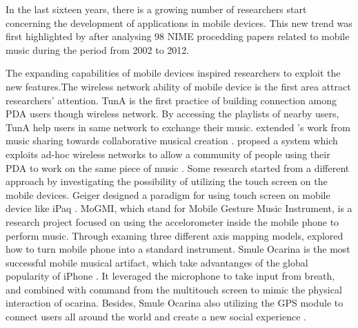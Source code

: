 In the last sixteen years, there is a growing number of researchers start concerning the development of applications in mobile devices. This new trend was first highlighted by \citeauthor{Reference12} after analysing 98 NIME procedding papers related to mobile music during the period from 2002 to 2012\citep{Reference12}.

The expanding capabilities of mobile devices inspired researchers to exploit the new features.The wireless network ability of mobile device is the first area attract researchers' attention. TunA is the first practice of building connection among PDA users though wireless network\citep{Reference7}. By accessing the playlists of nearby users, TunA help users in same network to exchange their music. \citeauthor{Reference5} extended \citeauthor{Reference7}'s work from music sharing towards collaborative musical creation \citep{Reference5}. \citeauthor{Reference5} propsed a system which exploits ad-hoc wireless networks to allow a community of people using their PDA to work on the same piece of music \citep{Reference5}. Some research started from a different approach by investigating the possibility of utilizing the touch screen on the mobile devices. Geiger designed a paradigm for using touch screen on mobile device like iPaq \citep{Reference9, Reference10}.
MoGMI, which stand for Mobile Gesture Music Instrument, is a research project focused on using the accelorometer inside the mobile phone to perform music. Through examing three different axis mapping models, \citeauthor{Reference11} explored how to turn mobile phone into a standard instrument. Smule Ocarina is the most successful mobile musical artifact, which take advantanges of the global popularity of iPhone \citep{Reference8.1}. It leveraged the microphone to take input from breath, and combined with command from the multitouch screen to mimic the physical interaction of ocarina. Besides, Smule Ocarina also utilizing the GPS module to connect users all around the world and create a new social experience \citep{Reference8}.


